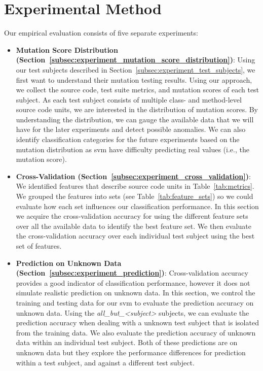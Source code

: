 \section{Experimental Method}
\label{sec:experiment_method}
Our empirical evaluation consists of five separate experiments:

\begin{itemize}
  \item \textbf{Mutation Score Distribution (Section~\ref{subsec:experiment_mutation_score_distribution})}: Using our test subjects described in Section~\ref{subsec:experiment_test_subjects}, we first want to understand their mutation testing results. Using our approach, we collect the source code, test suite metrics, and mutation scores of each test subject. As each test subject consists of multiple class- and method-level source code units, we are interested in the distribution of mutation scores. By understanding the distribution, we can gauge the available data that we will have for the later experiments and detect possible anomalies. We can also identify classification categories for the future experiments based on the mutation distribution as \gls{svm} have difficulty predicting real values (i.e., the mutation score).
  \item \textbf{Cross-Validation (Section~\ref{subsec:experiment_cross_validation})}: We identified features that describe source code units in Table~\ref{tab:metrics}. We grouped the features into sets (see Table~\ref{tab:feature_sets}) so we could evaluate how each set influences our classification performance. In this section we acquire the cross-validation accuracy for using the different feature sets over all the available data to identify the best feature set. We then evaluate the cross-validation accuracy over each individual test subject using the best set of features.
  \item \textbf{Prediction on Unknown Data (Section~\ref{subsec:experiment_prediction})}: Cross-validation accuracy provides a good indicator of classification performance, however it does not simulate realistic prediction on unknown data. In this section, we  control the training and testing data for our \gls{svm} to evaluate the prediction accuracy on unknown data. Using the \emph{all\_but\_<subject>} subjects, we can evaluate the prediction accuracy when dealing with a unknown test subject that is isolated from the training data. We also evaluate the prediction accuracy of unknown data within an individual test subject. Both of these predictions are on unknown data but they explore the performance differences for prediction within a test subject, and against a different test subject.

\end{itemize}
